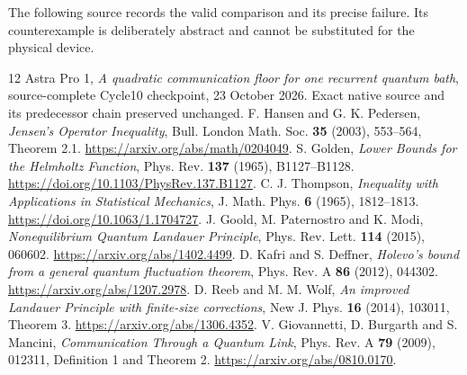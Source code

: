 \documentclass[11pt]{article}
\begin{document}
The following source records the valid comparison and its precise
failure. Its counterexample is deliberately abstract and cannot be
substituted for the physical device.


\begingroup\small
\begin{thebibliography}{12}
 Astra Pro 1, \emph{A quadratic communication floor for one
recurrent quantum bath}, source-complete Cycle10 checkpoint, 23 October 2026.
Exact native source and its predecessor chain preserved unchanged.
 F. Hansen and G. K. Pedersen, \emph{Jensen's Operator Inequality},
Bull. London Math. Soc. \textbf{35} (2003), 553--564, Theorem 2.1.
\url{https://arxiv.org/abs/math/0204049}.
 S. Golden, \emph{Lower Bounds for the Helmholtz Function},
Phys. Rev. \textbf{137} (1965), B1127--B1128.
\url{https://doi.org/10.1103/PhysRev.137.B1127}.
 C. J. Thompson, \emph{Inequality with Applications in
Statistical Mechanics}, J. Math. Phys. \textbf{6} (1965), 1812--1813.
\url{https://doi.org/10.1063/1.1704727}.
 J. Goold, M. Paternostro and K. Modi,
\emph{Nonequilibrium Quantum Landauer Principle},
Phys. Rev. Lett. \textbf{114} (2015), 060602.
\url{https://arxiv.org/abs/1402.4499}.
 D. Kafri and S. Deffner, \emph{Holevo's bound from a general
quantum fluctuation theorem}, Phys. Rev. A \textbf{86} (2012), 044302.
\url{https://arxiv.org/abs/1207.2978}.
 D. Reeb and M. M. Wolf, \emph{An improved Landauer Principle
with finite-size corrections}, New J. Phys. \textbf{16} (2014), 103011,
Theorem 3. \url{https://arxiv.org/abs/1306.4352}.
 V. Giovannetti, D. Burgarth and S. Mancini,
\emph{Communication Through a Quantum Link},
Phys. Rev. A \textbf{79} (2009), 012311, Definition 1 and Theorem 2.
\url{https://arxiv.org/abs/0810.0170}.
\end{thebibliography}
\endgroup
\end{document}
